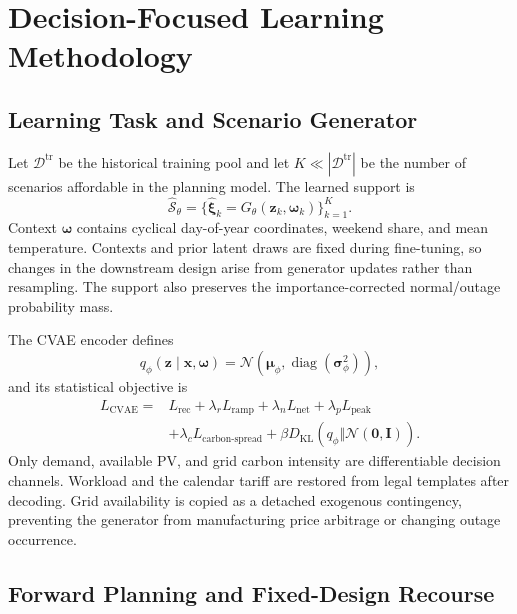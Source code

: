 \documentclass[times]{elsarticle}
\begin{document}
\section{Decision-Focused Learning Methodology}
\label{sec:methodology}

\subsection{Learning Task and Scenario Generator}

Let $\mathcal D^{\mathrm{tr}}$ be the historical training pool and let
$K\ll|\mathcal D^{\mathrm{tr}}|$ be the number of scenarios affordable in the
planning model. The learned support is
\begin{equation}
\widehat{\mathcal S}_\theta=
\{\widehat{\bm\xi}_k=G_\theta(\bm z_k,\bm\omega_k)\}_{k=1}^K.
\label{eq:generated_support}
\end{equation}
Context $\bm\omega$ contains cyclical day-of-year coordinates, weekend share,
and mean temperature. Contexts and prior latent draws are fixed during
fine-tuning, so changes in the downstream design arise from generator updates
rather than resampling. The support also preserves the importance-corrected
normal/outage probability mass.

The CVAE encoder defines
\begin{equation}
q_\phi(\bm z\mid\bm x,\bm\omega)=
\mathcal N(\bm\mu_\phi,\operatorname{diag}(\bm\sigma_\phi^2)),
\label{eq:cvae}
\end{equation}
and its statistical objective is
\begin{align}
L_{\mathrm{CVAE}}={}&L_{\mathrm{rec}}+\lambda_rL_{\mathrm{ramp}}
+\lambda_nL_{\mathrm{net}}+\lambda_pL_{\mathrm{peak}}
\nonumber\\
&+\lambda_cL_{\mathrm{carbon\mbox{-}spread}}
+\beta D_{\mathrm{KL}}(q_\phi\Vert\mathcal N(\bm0,\bm I)).
\label{eq:cvae_loss}
\end{align}
Only demand, available PV, and grid carbon intensity are differentiable
decision channels. Workload and the calendar tariff are restored from legal
templates after decoding. Grid availability is copied as a detached exogenous
contingency, preventing the generator from manufacturing price arbitrage or
changing outage occurrence.

\subsection{Forward Planning and Fixed-Design Recourse}
\end{document}
